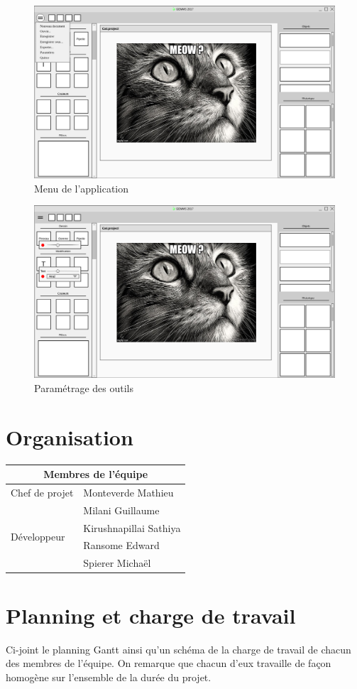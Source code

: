 \documentclass[11pt, a4paper, french]{article}
\begin{document}
		\begin{figure}[h!]
			\centering
			\graphicspath{{Mockups/}}
			\includegraphics[scale=0.3]{mockups/menu.png}
			\caption{\label{étiquette} Menu de l'application}
		\end{figure}

		\begin{figure}[h!]
			\centering
			\graphicspath{{Mockups/}}
			\includegraphics[scale=0.3]{mockups/tools_settings.png}
			\caption{\label{étiquette} Paramétrage des outils}
		\end{figure}


	\section{Organisation}
		\begin{tabular}{|l|l|}
			\hline
			\multicolumn{2}{|c|}{Membres de l'équipe} \\
			\hline
			Chef de projet &  Monteverde Mathieu \\ \hline
			\multirow{4}{*}{Développeur}
			& Milani Guillaume \\
			& Kirushnapillai Sathiya \\
			& Ransome Edward \\
			& Spierer Michaël \\ \hline
		\end{tabular}

	\section{Planning et charge de travail}
	Ci-joint le planning Gantt ainsi qu'un schéma de la charge de travail de chacun des membres de l'équipe. On remarque que chacun d'eux travaille de façon homogène sur l'ensemble de la durée du projet.
\end{document}
